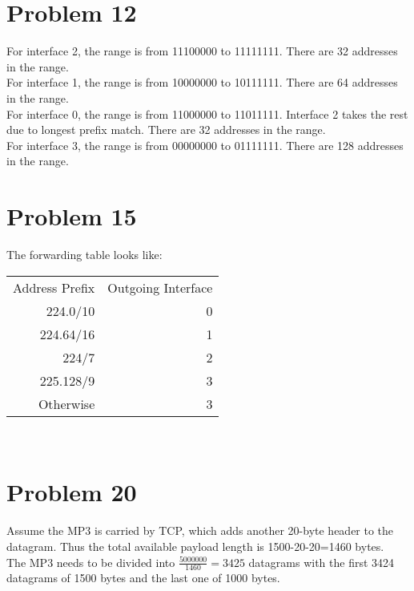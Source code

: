 \documentclass[titlepage, paper=a4, fontsize=11pt]{scrartcl} %
\numberwithin{equation}{section} %
\numberwithin{table}{section} %
\begin{document}

\section*{Problem 12}
For interface 2, the range is from 11100000 to 11111111. There are 32 addresses in the range. \\
For interface 1, the range is from 10000000 to 10111111. There are 64 addresses in the range. \\
For interface 0, the range is from 11000000 to 11011111. Interface 2 takes the rest due to longest prefix match. There are 32 addresses in the range. \\
For interface 3, the range is from 00000000 to 01111111. There are 128 addresses in the range. \\





\section*{Problem 15}
The forwarding table looks like: \\
\begin{tabular}{ r | r  }
  Address Prefix & Outgoing Interface \\
  224.0/10 & 0 \\
  224.64/16 & 1 \\
  224/7 & 2 \\
  225.128/9 & 3 \\
  Otherwise & 3 \\
\end{tabular}
\\




\section*{Problem 20}
Assume the MP3 is carried by TCP, which adds another 20-byte header to the datagram. Thus the total available payload length is 1500-20-20=1460 bytes. \\
The MP3 needs to be divided into $\frac{5000000}{1460}=3425$ datagrams with the first 3424 datagrams of 1500 bytes and the last one of 1000 bytes. \\
\end{document}
